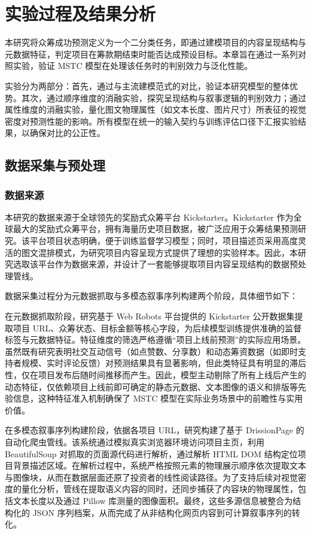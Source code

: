 \newpage
\setcounter{table}{0}
\setcounter{figure}{0}
\section{实验过程及结果分析}

本研究将众筹成功预测定义为一个二分类任务，即通过建模项目的内容呈现结构与元数据特征，判定项目在筹款期结束时能否达成预设目标。本章旨在通过一系列对照实验，验证 MSTC 模型在处理该任务时的判别效力与泛化性能。

实验分为两部分：首先，通过与主流建模范式的对比，验证本研究模型的整体优势。其次，通过顺序维度的消融实验，探究呈现结构与叙事逻辑的判别效力；通过属性维度的消融实验，量化图文物理属性（如文本长度、图片尺寸）所表征的视觉密度对预测性能的影响。所有模型在统一的输入契约与训练评估口径下汇报实验结果，以确保对比的公正性。

\subsection{数据采集与预处理}

\subsubsection{数据来源}

本研究的数据来源于全球领先的奖励式众筹平台 Kickstarter。Kickstarter 作为全球最大的奖励式众筹平台，拥有海量历史项目数据，被广泛应用于众筹结果预测研究。该平台项目状态明确，便于训练监督学习模型；同时，项目描述页采用高度灵活的图文混排模式，为研究项目内容呈现方式提供了理想的实验样本。因此，本研究选取该平台作为数据来源，并设计了一套能够提取项目内容呈现结构的数据预处理管线。

数据采集过程分为元数据抓取与多模态叙事序列构建两个阶段，具体细节如下：

在元数据抓取阶段，研究基于 Web Robots 平台提供的 Kickstarter 公开数据集提取项目 URL、众筹状态、目标金额等核心字段，为后续模型训练提供准确的监督标签与元数据特征。特征维度的筛选严格遵循``项目上线前预测''的实际应用场景。虽然既有研究表明社交互动信号（如点赞数、分享数）和动态筹资数据（如即时支持者规模、实时评论反馈）对预测结果具有显著影响，但此类特征具有明显的滞后性，仅在项目发布后随时间推移而产生。因此，模型主动剔除了所有上线后产生的动态特征，仅依赖项目上线前即可确定的静态元数据、文本图像的语义和排版等先验信息，这种特征准入机制确保了 MSTC 模型在实际业务场景中的前瞻性与实用价值。

在多模态叙事序列构建阶段，依据各项目 URL，研究构建了基于 DrissionPage 的自动化爬虫管线。该系统通过模拟真实浏览器环境访问项目主页，利用 BeautifulSoup 对抓取的页面源代码进行解析，通过解析 HTML DOM 结构定位项目背景描述区域。在解析过程中，系统严格按照元素的物理展示顺序依次提取文本与图像块，从而在数据层面还原了投资者的线性阅读路径。为了支持后续对视觉密度的量化分析，管线在提取语义内容的同时，还同步捕获了内容块的物理属性，包括文本长度以及通过 Pillow 库测量的图像面积。最终，这些多源信息被整合为结构化的 JSON 序列档案，从而完成了从非结构化网页内容到可计算叙事序列的转化。

